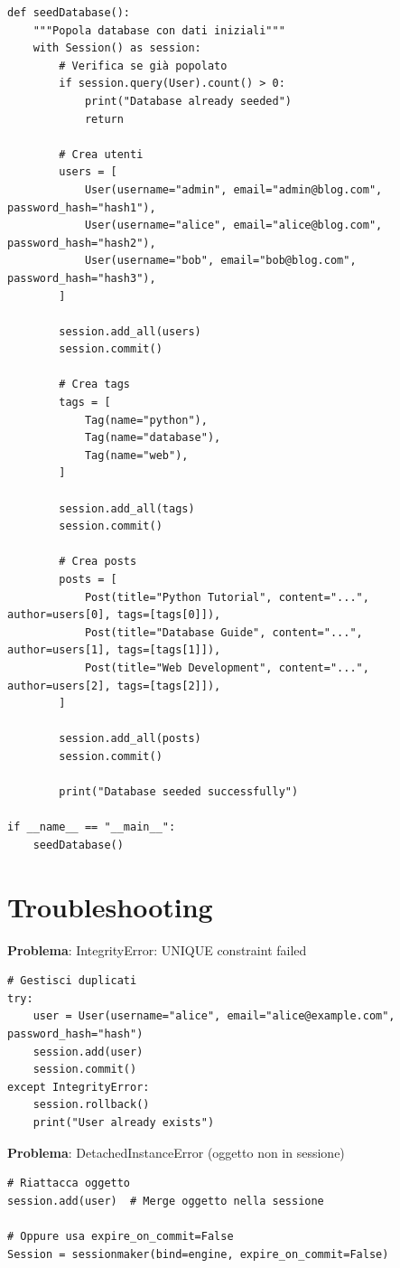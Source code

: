\begin{lstlisting}
def seedDatabase():
    """Popola database con dati iniziali"""
    with Session() as session:
        # Verifica se già popolato
        if session.query(User).count() > 0:
            print("Database already seeded")
            return

        # Crea utenti
        users = [
            User(username="admin", email="admin@blog.com", password_hash="hash1"),
            User(username="alice", email="alice@blog.com", password_hash="hash2"),
            User(username="bob", email="bob@blog.com", password_hash="hash3"),
        ]

        session.add_all(users)
        session.commit()

        # Crea tags
        tags = [
            Tag(name="python"),
            Tag(name="database"),
            Tag(name="web"),
        ]

        session.add_all(tags)
        session.commit()

        # Crea posts
        posts = [
            Post(title="Python Tutorial", content="...", author=users[0], tags=[tags[0]]),
            Post(title="Database Guide", content="...", author=users[1], tags=[tags[1]]),
            Post(title="Web Development", content="...", author=users[2], tags=[tags[2]]),
        ]

        session.add_all(posts)
        session.commit()

        print("Database seeded successfully")

if __name__ == "__main__":
    seedDatabase()
\end{lstlisting}

\section{Troubleshooting}

\textbf{Problema}: IntegrityError: UNIQUE constraint failed
\begin{lstlisting}
# Gestisci duplicati
try:
    user = User(username="alice", email="alice@example.com", password_hash="hash")
    session.add(user)
    session.commit()
except IntegrityError:
    session.rollback()
    print("User already exists")
\end{lstlisting}

\textbf{Problema}: DetachedInstanceError (oggetto non in sessione)
\begin{lstlisting}
# Riattacca oggetto
session.add(user)  # Merge oggetto nella sessione

# Oppure usa expire_on_commit=False
Session = sessionmaker(bind=engine, expire_on_commit=False)
\end{lstlisting}

